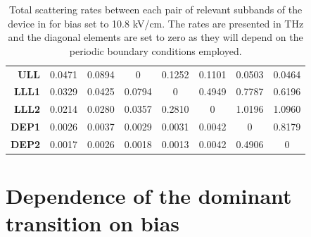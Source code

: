 \documentclass[10pt,letterpaper]{article}
\begin{document}
{\begin{appendices}
\begin{table}[H]
\begin{tabular}{ r | c c c c c c c}
\textbf{ULL}  &    0.0471  &   0.0894   &       0 &    0.1252  &   0.1101 &    0.0503 &    0.0464  \\
\textbf{LLL1}  &   0.0329  &   0.0425  &   0.0794   &       0  &   0.4949  &   0.7787 &    0.6196 \\
\textbf{LLL2}  &0.0214   &  0.0280  &   0.0357  &   0.2810    &      0  &   1.0196 &    1.0960\\ 
\textbf{DEP1}  &   0.0026  &  0.0037  &   0.0029 &    0.0031 &    0.0042   &       0   &  0.8179  \\
\textbf{DEP2}  & 0.0017  &   0.0026  &   0.0018  &   0.0013   &  0.0042 &    0.4906    &      0\\
\hline 
\end{tabular}
\caption[Table caption text]{ Total scattering rates between each pair of relevant subbands of the device in \cite{burghoff2014terahertz} for bias set to 10.8 kV/cm. The rates are presented in THz and the diagonal elements are set to zero as they will depend on the periodic boundary conditions employed.}
\label{tab:table02}
\end{table}


\section{Dependence of the dominant transition on bias}


\end{appendices}}
\end{document}
